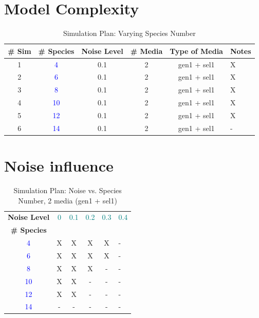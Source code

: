 \documentclass[10pt,A4paper]{article}
\newcommand{\chng}[1]{\textcolor{blue} {#1}}
\newcommand{\chngn}[1]{\textcolor{teal} {#1}}
\begin{document}
\section{Model Complexity}

\begin{table}[htbp]
\centering
\caption{Simulation Plan: Varying Species Number}
\begin{tabular}{@{} cccccl @{}}
\toprule
\textbf{\# Sim} & 
\textbf{\# Species} & 
\textbf{Noise Level} & 
\textbf{\# Media} & 
\textbf{Type of Media} & 
\textbf{Notes} \\
\midrule
1 & \chng{4}  & 0.1  & 2 & gen1 + sel1  &  X\\
2 & \chng{6}  & 0.1  & 2 & gen1 + sel1  &  X\\
3 & \chng{8}  & 0.1  & 2 & gen1 + sel1  &  X\\
4 & \chng{10} & 0.1  & 2 & gen1 + sel1  &  X\\
5 & \chng{12} & 0.1  & 2 & gen1 + sel1  &  X\\
6 & \chng{14} & 0.1  & 2 & gen1 + sel1  &  -\\
\bottomrule
\end{tabular}
\label{tab:simulation-plan-species}
\end{table}

\section{Noise influence}
\begin{table}[htbp]
\centering
\caption{Simulation Plan: Noise vs. Species Number, 2 media (gen1 + sel1)}    
\begin{tabular}{@{} cccccl @{}}
\toprule
\textbf{Noise Level} & \chngn{0} & \chngn{0.1}& \chngn{0.2} & \chngn{0.3} & \chngn{0.4} \\
\textbf{\# Species} & & & & & \\
\midrule
\chng{4}  & X & X & X & X & - \\
\chng{6}  & X & X & X & X & - \\
\chng{8}  & X & X & X & - & - \\
\chng{10} & X & X & - & - & - \\
\chng{12} & X & X & - & - & - \\
\chng{14} & - & - & - & - & - \\
\bottomrule
\end{tabular}
\label{tab:simulation-plan-species-noise}
\end{table}
\end{document}
